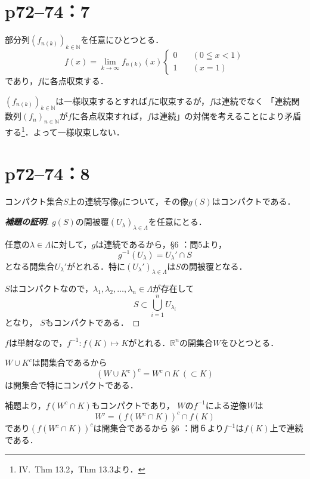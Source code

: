 \section*{p72--74：7}

\begin{tproof}
    部分列$(f_{n(k)})_{k \in \mathbb{N}}$を任意にひとつとる．
    \[
        f(x)= \lim_{k \to \infty} f_{n(k)}(x)
        \begin{cases}
            0 \quad  & ( 0 \leqq x < 1) \\
            1  \quad & ( x=1)
        \end{cases}
    \]
    であり，$f$に各点収束する．

    $(f_{n(k)})_{k \in \mathbb{N}}$は一様収束するとすれば$f$に収束するが，$f$は連続でなく
    「連続関数列$(f_n)_{n \in \mathbb{N}}$が$f$に各点収束すれば，$f$は連続」の対偶を考えることにより矛盾する\footnote{IV.~Thm 13.2，Thm 13.3より．}．よって一様収束しない．
\end{tproof}




\section*{p72--74：8}

\begin{lemma}{}{}
    コンパクト集合$S$上の連続写像$g$について，その像$g(S)$はコンパクトである．
\end{lemma}

\begin{proof}[\textup{\textbf{補題の証明}}]
    $g(S)$の開被覆$(U_{\lambda})_{\lambda \in \Lambda}$を任意にとる．

    任意の$\lambda \in \Lambda$に対して，$g$は連続であるから，\S 6 ：問5より，
    \[
        g^{-1}(U_{\lambda}) =  U_{\lambda}'  \cap S
    \]
    となる開集合$U_{\lambda}'$がとれる．特に$(U_{\lambda}')_{\lambda \in \Lambda}$は$S$の開被覆となる．

    $S$はコンパクトなので，$\lambda_1, \lambda_2, \ldots , \lambda_n \in \Lambda$が存在して
    \[
        S \subset \bigcup_{i=1}^{n} U_{\lambda_i}
    \]
    となり， $S$もコンパクトである．
\end{proof}


\begin{tproof}
    $f$は単射なので，$f^{-1} \colon f(K) \mapsto K$がとれる．$\mathbb{R}^n$の開集合$W$をひとつとる．

    $W \cup K^c$は開集合であるから
    \[
        (W \cup K^c)^c = W^c \cap K~(\subset K)
    \]
    は開集合で特にコンパクトである．

    補題より，$f(W^c \cap K)$もコンパクトであり，
    $W$の$f^{-1}$による逆像$W$は
    \[
        W' = (f(W^c \cap K))^c \cap f(K)
    \]
    であり$(f(W^c \cap K))^c$は開集合であるから
    \S 6 ：問６より$f^{-1}$は$f(K)$上で連続である．
\end{tproof}



